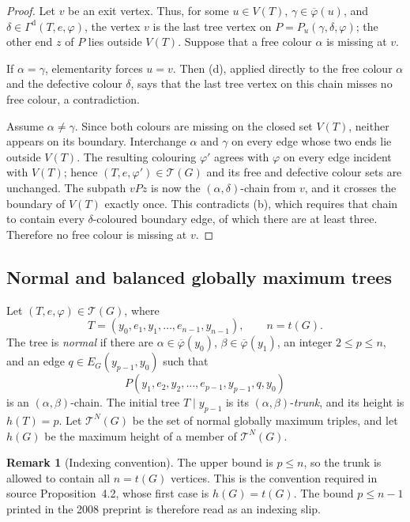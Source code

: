 \documentclass[11pt]{article}
\theoremstyle{definition}
\newtheorem{remark}[remark]{Remark}
\newcommand{\Tcal}{\mathcal T}
\newcommand{\Dcol}{\Gamma^{\mathrm d}}
\begin{document}
\begin{proof}
Let $v$ be an exit vertex. Thus, for some $u\in V(T)$,
$\gamma\in\overline\varphi(u)$, and
$\delta\in\Dcol(T,e,\varphi)$, the vertex $v$ is the last tree vertex on
$P=P_u(\gamma,\delta,\varphi)$; the other end $z$ of $P$ lies outside
$V(T)$. Suppose that a free colour $\alpha$ is missing at $v$.

If $\alpha=\gamma$, elementarity forces $u=v$. Then
(d), applied directly to the free colour $\alpha$ and
the defective colour $\delta$, says that the last tree vertex on this chain
misses no free colour, a contradiction.

Assume $\alpha\ne\gamma$. Since both colours are missing on the closed set
$V(T)$, neither appears on its boundary. Interchange $\alpha$ and $\gamma$
on every edge whose two ends lie outside $V(T)$. The resulting colouring
$\varphi'$ agrees with $\varphi$ on every edge incident with $V(T)$; hence
$(T,e,\varphi')\in\Tcal(G)$ and its free and defective colour sets are
unchanged. The subpath $vPz$ is now the
$(\alpha,\delta)$-chain from $v$, and it crosses the boundary of $V(T)$
exactly once. This contradicts (b), which requires
that chain to contain every $\delta$-coloured boundary edge, of which there
are at least three. Therefore no free colour is missing at $v$.
\end{proof}

\subsection*{Normal and balanced globally maximum trees}

Let $(T,e,\varphi)\in\Tcal(G)$, where
\[
 T=(y_0,e_1,y_1,\ldots,e_{n-1},y_{n-1}),\qquad n=t(G).
\]
The tree is \emph{normal} if there are
$\alpha\in\overline\varphi(y_0)$,
$\beta\in\overline\varphi(y_1)$, an integer $2\le p\le n$, and an edge
$q\in E_G(y_{p-1},y_0)$ such that
\[
 P(y_1,e_2,y_2,\ldots,e_{p-1},y_{p-1},q,y_0)
\]
is an $(\alpha,\beta)$-chain. The initial tree
$T\mathbin{|}y_{p-1}$ is its $(\alpha,\beta)$-\emph{trunk}, and its height
is $h(T)=p$. Let $\Tcal^N(G)$ be the set of normal globally maximum triples,
and let $h(G)$ be the maximum height of a member of $\Tcal^N(G)$.

\begin{remark}[Indexing convention]
The upper bound is $p\le n$, so the trunk is allowed to contain all
$n=t(G)$ vertices. This is the convention required in source
Proposition~4.2, whose first case is $h(G)=t(G)$. The bound $p\le n-1$
printed in the 2008 preprint is therefore read as an indexing slip.
\end{remark}
\end{document}
